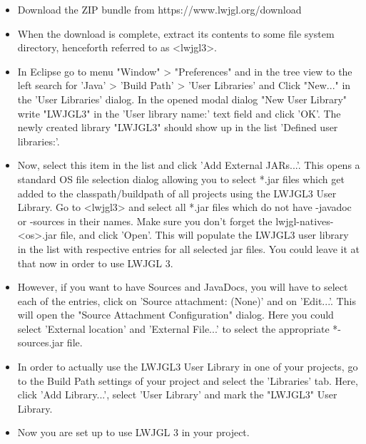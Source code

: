 \documentclass[a4paper, 11pt]{article}
\begin{document}
\begin{itemize}
   \item     Download the ZIP bundle from https://www.lwjgl.org/download
   \item     When the download is complete, extract its contents to some file system directory, henceforth referred to as <lwjgl3>.
   \item     In Eclipse go to menu "Window" > "Preferences" and in the tree view to the left search for 'Java' > 'Build Path' > 'User Libraries' and Click "New..." in the 'User Libraries' dialog. In the opened modal dialog "New User Library" write "LWJGL3" in the 'User library name:' text field and click 'OK'. The newly created library "LWJGL3" should show up in the list 'Defined user libraries:'.
   \item     Now, select this item in the list and click 'Add External JARs...'. This opens a standard OS file selection dialog allowing you to select *.jar files which get added to the classpath/buildpath of all projects using the LWJGL3 User Library. Go to <lwjgl3> and select all *.jar files which do not have -javadoc or -sources in their names. Make sure you don't forget the lwjgl-natives-<os>.jar file, and click 'Open'. This will populate the LWJGL3 user library in the list with respective entries for all selected jar files. You could leave it at that now in order to use LWJGL 3.
   \item     However, if you want to have Sources and JavaDocs, you will have to select each of the entries, click on 'Source attachment: (None)' and on 'Edit...'. This will open the "Source Attachment Configuration" dialog. Here you could select 'External location' and 'External File...' to select the appropriate *-sources.jar file.
   \item     In order to actually use the LWJGL3 User Library in one of your projects, go to the Build Path settings of your project and select the 'Libraries' tab. Here, click 'Add Library...', select 'User Library' and mark the "LWJGL3" User Library.
   \item     Now you are set up to use LWJGL 3 in your project.
\end{itemize}

\end{document}
